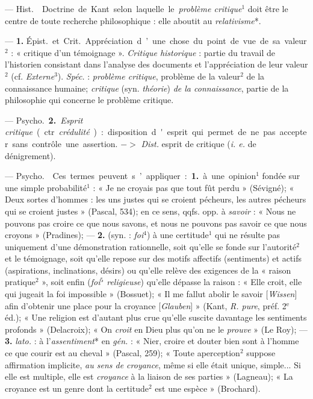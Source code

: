 \begin{itemize}[leftmargin=1cm, label=, itemsep=11pt]
 — \si{Hist.}  Doctrine de
Kant selon laquelle le {\it problème
critique}$^1$ doit être le centre de toute
recherche philosophique : elle aboutit
au {\it relativisme}*.

 — {\bf 1.} \si{Épist.} et \si{Crit.} Appréciation d’une chose du point de vue
de sa valeur$^2$ : « critique d’un témoignage ».
{\it Critique historique} : partie
du travail de l'historien consistant
dans l'analyse des documents et
l'appréciation de leur valeur$^2$ (cf.
{\it Externe}$^3$). {\it Spéc.} : {\it problème critique},
problème de la valeur$^2$ de la connaissance humaine; {\it critique} (syn.
{\it théorie}) {\it de la connaissance}, partie de
la philosophie qui concerne le problème critique.

— \si{Psycho.} {\bf 2.} {\it Esprit critique} (ctr.
{\it crédulité}) : disposition d'esprit qui
permet de ne pas accepter sans contrôle une assertion. $->$ {\it Dist.} esprit
de critique ({\it i. e.} de dénigrement).

 — \si{Psycho.}  Ces
termes peuvent s’appliquer : {\bf 1.} à
une opinion$^1$ fondée sur une simple
probabilité$^1$ : « Je ne croyais pas que
tout fût perdu » (Sévigné); « Deux
sortes d'hommes : les uns justes qui
se croient pécheurs, les autres pécheurs qui se croient justes » (Pascal,
534); en ce sens, qqfs. opp. à {\it savoir} :
« Nous ne pouvons pas croire ce que
nous savons, et nous ne pouvons
pas savoir ce que nous croyons »
(Pradines); — {\bf 2.} (syn. : {\it foi}$^4$) à une
certitude$^1$ qui ne résulte pas uniquement d'une démonstration rationnelle, soit qu’elle se fonde sur l’autorité$^2$ et le témoignage, soit qu'elle
repose sur des motifs affectifs (sentiments) et actifs (aspirations, inclinations, désirs) ou qu'elle relève des
exigences de la « raison pratique$^2$ »,
soit enfin ({\it foi$^5$ religieuse}) qu’elle
dépasse la raison : « Elle croit, elle
qui jugeait la foi impossible »
(Bossuet); « Il me fallut abolir le
savoir [{\it Wissen}] afin d'obtenir une
place pour la croyance [{\it Glauben}] »
(Kant, {\it R. pure}, préf. 2$^\text{e}$ éd.); « Une
religion est d’autant plus crue qu’elle
suscite davantage les sentiments
profonds » (Delacroix); « On {\it croit} en
Dieu plus qu’on ne le {\it prouve} » (Le
Roy); — {\bf 3.} {\it lato.} : à l'{\it assentiment}* en
 {\it gén.} : « Nier, croire et douter bien
sont à l’homme ce que courir est au
cheval » (Pascal, 259); « Toute aperception$^2$ suppose affirmation implicite, {\it au sens de croyance}, même si
elle était unique, simple... Si elle
est multiple, elle est {\it croyance} à la
liaison de ses parties » (Lagneau);
« La croyance est un genre dont
la certitude$^2$ est une espèce » (Brochard).


\end{itemize}
